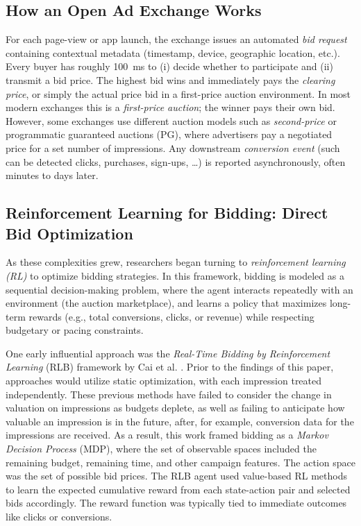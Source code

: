 \documentclass[11pt]{article}
\begin{document}
\subsection{How an Open Ad Exchange Works}
\label{sec:exchange}

For each page-view or app launch, the exchange issues an automated \emph{bid
request} containing contextual metadata (timestamp, device, geographic location,
etc.).  Every buyer has roughly \SI{100}{\milli\second} to (i) decide
whether to participate and (ii) transmit a bid price.
The highest bid wins and immediately pays the \emph{clearing price}, or simply the actual price bid in a first-price auction environment.
In most modern exchanges this is a \emph{first-price auction}; the
winner pays their own bid. However, some exchanges use different auction
models such as \emph{second-price} or programmatic guaranteed auctions (PG), where advertisers pay a negotiated price for a set number of impressions.
Any downstream \emph{conversion event} (such can be detected clicks, purchases, sign-ups, \dots) is reported asynchronously, often minutes to days later. 


\subsection{Reinforcement Learning for Bidding: Direct Bid Optimization}

As these complexities grew, researchers began turning to \emph{reinforcement learning (RL)} to optimize bidding strategies. In this framework, bidding is modeled as a sequential decision-making problem, where the agent interacts repeatedly with an environment (the auction marketplace), and learns a policy that maximizes long-term rewards (e.g., total conversions, clicks, or revenue) while respecting budgetary or pacing constraints.

One early influential approach was the \textit{Real-Time Bidding by Reinforcement Learning} (RLB) framework by Cai et al. \cite{cai2017real}. Prior to the findings of this paper, approaches would utilize static optimization, with each impression treated independently. These previous methods have failed to consider the change in valuation on impressions as budgets deplete, as well as failing to anticipate how valuable an impression is in the future, after, for example, conversion data for the impressions are received. As a result, this work framed bidding as a \textit{Markov Decision Process} (MDP), where the set of observable spaces included the remaining budget, remaining time, and other campaign features. The action space was the set of possible bid prices. The RLB agent used value-based RL methods to learn the expected cumulative reward from each state-action pair and selected bids accordingly. The reward function was typically tied to immediate outcomes like clicks or conversions.
\end{document}
